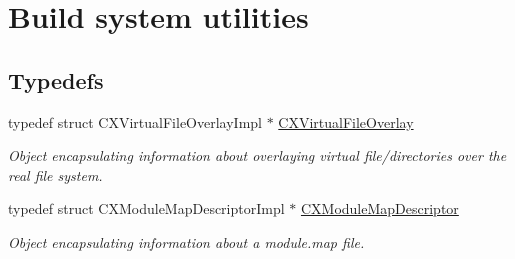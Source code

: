 \hypertarget{group__BUILD__SYSTEM}{}\section{Build system utilities}
\label{group__BUILD__SYSTEM}
\subsection*{Typedefs}
\begin{DoxyCompactItemize}
\item 
\mbox{\label{group__BUILD__SYSTEM_gae854e36ceb0a02071e557e19f908772d}} 
typedef struct C\+X\+Virtual\+File\+Overlay\+Impl $\ast$ \hyperlink{group__BUILD__SYSTEM_gae854e36ceb0a02071e557e19f908772d}{C\+X\+Virtual\+File\+Overlay}
\begin{DoxyCompactList}\small\item\em Object encapsulating information about overlaying virtual file/directories over the real file system. \end{DoxyCompactList}\item 
\mbox{\label{group__BUILD__SYSTEM_ga8d7eea7855a8d1118218c7661469b3db}} 
typedef struct C\+X\+Module\+Map\+Descriptor\+Impl $\ast$ \hyperlink{group__BUILD__SYSTEM_ga8d7eea7855a8d1118218c7661469b3db}{C\+X\+Module\+Map\+Descriptor}
\begin{DoxyCompactList}\small\item\em Object encapsulating information about a module.\+map file. \end{DoxyCompactList}\end{DoxyCompactItemize}
